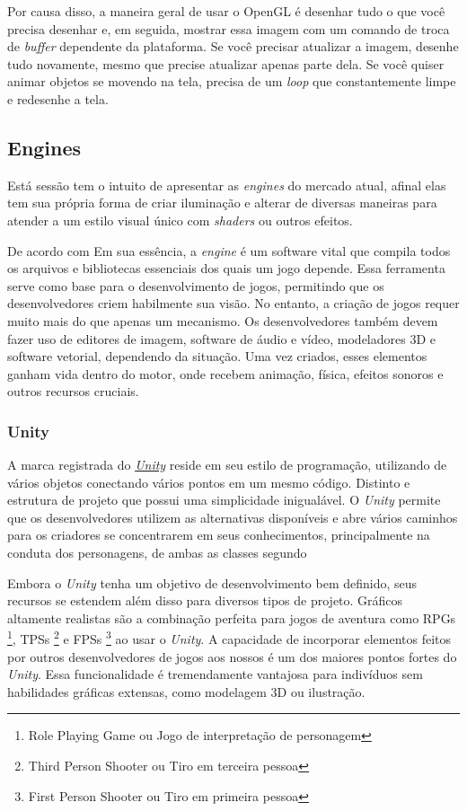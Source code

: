 Por causa disso, a maneira geral de usar o OpenGL é desenhar tudo o que você precisa desenhar e, em seguida, mostrar essa imagem com um comando de troca de \textit{buffer} dependente da plataforma. Se você precisar atualizar a imagem, desenhe tudo novamente, mesmo que precise atualizar apenas parte dela. Se você quiser animar objetos se movendo na tela, precisa de um \textit{loop} que constantemente limpe e redesenhe a tela.

\subsection{Engines}

Está sessão tem o intuito de apresentar as \textit{engines} do mercado atual, afinal elas tem sua própria forma de criar iluminação e alterar de diversas maneiras para atender a um estilo visual único com \textit{shaders} ou outros efeitos.

De acordo com \cite{Felipe2017-av} Em sua essência, a \textit{engine} é um software vital que compila todos os arquivos e bibliotecas essenciais dos quais um jogo depende. Essa ferramenta serve como base para o desenvolvimento de jogos, permitindo que os desenvolvedores criem habilmente sua visão.  No entanto, a criação de jogos requer muito mais do que apenas um mecanismo.  Os desenvolvedores também devem fazer uso de editores de imagem, software de áudio e vídeo, modeladores 3D e software vetorial, dependendo da situação.  Uma vez criados, esses elementos ganham vida dentro do motor, onde recebem animação, física, efeitos sonoros e outros recursos cruciais.

\subsubsection{Unity}
A marca registrada do \href{https://unity.com/pt}{\textit{Unity}} reside em seu estilo de programação, utilizando de vários objetos conectando vários pontos em um mesmo código. Distinto e estrutura de projeto que possui uma simplicidade inigualável.  O \textit{Unity} permite que os desenvolvedores utilizem as alternativas disponíveis e abre vários caminhos para os criadores se concentrarem em seus conhecimentos, principalmente na conduta dos personagens, de ambas as classes segundo \cite{Henrique2014-ka}

Embora o \textit{Unity} tenha um objetivo de desenvolvimento bem definido, seus recursos se estendem além disso para diversos tipos de projeto.  Gráficos altamente realistas são a combinação perfeita para jogos de aventura como RPGs \footnote{Role Playing Game ou Jogo de interpretação de personagem}, TPSs \footnote{Third Person Shooter ou Tiro em terceira pessoa} e FPSs \footnote{First Person Shooter ou Tiro em primeira pessoa} ao usar o \textit{Unity}.  A capacidade de incorporar elementos feitos por outros desenvolvedores de jogos aos nossos é um dos maiores pontos fortes do \textit{Unity}.  Essa funcionalidade é tremendamente vantajosa para indivíduos sem habilidades gráficas extensas, como modelagem 3D ou ilustração.

